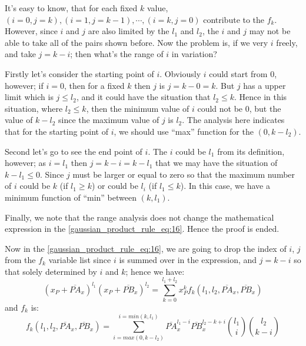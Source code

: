 It's easy to know, that for each fixed $k$ value, $(i=0,j=k), (i=1,j=k-1), \cdots, 
(i=k,j=0)$ contribute to the $f_{k}$. However, since $i$ and $j$ are also limited by the 
$l_{1}$ and $l_{2}$, the $i$ and $j$ may not be able to take all of the pairs shown before.  
Now the problem is, if we very $i$ freely, and take $j=k-i$; then what's the range of $i$
in variation? 

Firstly let's consider the starting point of $i$. Obviously $i$ could start from $0$, however;
if $i=0$, then for a fixed $k$ then $j$ is $j=k-0=k$. But $j$ has a upper limit which is 
$j\leq l_{2}$, and it could have the situation that $l_{2} \leq k$. Hence in this situation, 
where $l_{2} \leq k$, then the minimum value of $i$ could not be $0$, but the value of $k-l_{2}$
since the maximum value of $j$ is $l_{2}$. The analysis here indicates that for the starting 
point of $i$, we should use ``max'' function for the $(0, k-l_{2})$.

Second let's go to see the end point of $i$. The $i$ could be $l_{1}$ from its definition,
however; as $i=l_{1}$ then $j=k-i=k-l_{1}$ that we may have the situation of $k-l_{1}\leq 0$.
Since $j$ must be larger or equal to zero so that the maximum number of $i$ could be $k$ 
(if $l_{1}\geq k$) or could be $l_{i}$ (if $l_{1}\leq k$). In this case, we have a minimum 
function of ``min'' between $(k,l_{1})$.

Finally, we note that the range analysis does not change the mathematical expression in the 
\ref{gaussian_product_rule_eq:16}. Hence the proof is ended. 

Now in the \ref{gaussian_product_rule_eq:16}, we are going to drop the index of $i$, $j$ from
the $f_{k}$ variable list since $i$ is summed over in the expression, and $j=k-i$ so that solely
determined by $i$ and $k$; hence we have:
\begin{equation}
\label{gaussian_product_rule_eq:17}
 (x_{P} +\overline{PA}_{x})^{l_{1}}(x_{P} + \overline{PB}_{x})^{l_{2}} = 
\sum_{k=0}^{l_{1}+l_{2}}x_{P}^{k}f_{k}(l_{1},l_{2},\overline{PA}_{x},\overline{PB}_{x}) 
\end{equation}
and $f_{k}$ is:
\begin{equation}
 \label{gaussian_product_rule_eq:18_0}
f_{k}(l_{1},l_{2},\overline{PA}_{x},\overline{PB}_{x}) = 
\sum_{i=max(0,k-l_{2})}^{i=min(k,l_{1})}\overline{PA}_{x}^{l_{1}-i}
\overline{PB}_{x}^{l_{2}-k+i}\binom{l_{1}}{i}\binom{l_{2}}{k-i}
\end{equation}

